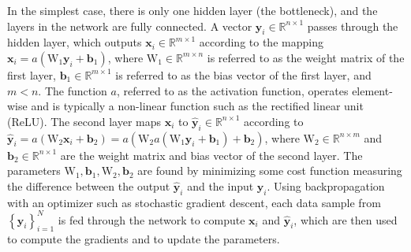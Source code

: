 \documentclass[journal]{IEEEtran}
\begin{document}
In the simplest case, there is only one hidden layer (the bottleneck), and the layers in the network are fully connected. A vector $\textbf{y}_i \in \mathbb{R}^{n \times 1}$ passes through the hidden layer, which outputs $\textbf{x}_i \in \mathbb{R}^{m \times 1}$ according to the mapping $\textbf{x}_i = a\left( \text{W}_1 \textbf{y}_i + \textbf{b}_1 \right)$, where $\text{W}_1 \in \mathbb{R}^{m \times n}$ is referred to as the weight matrix of the first layer, $\textbf{b}_1 \in \mathbb{R}^{m \times 1}$ is referred to as the bias vector of the first layer, and $m < n$. The function $a$, referred to as the activation function, operates element-wise and is typically a non-linear function such as the rectified linear unit (ReLU). The second layer maps $\textbf{x}_i$ to $\hat{\textbf{y}}_i \in \mathbb{R}^{n \times 1}$ according to $\hat{\textbf{y}}_i = a\left( \text{W}_2 \textbf{x}_i + \textbf{b}_2 \right) = a\left( \text{W}_2 a\left( \text{W}_1 \textbf{y}_i + \textbf{b}_1 \right)+ \textbf{b}_2 \right)$, where $\text{W}_2 \in \mathbb{R}^{n \times m}$ and $\textbf{b}_2 \in \mathbb{R}^{n \times 1}$ are the weight matrix and bias vector of the second layer. The parameters $\text{W}_1, \textbf{b}_1, \text{W}_2, \textbf{b}_2$ are found by minimizing some cost function measuring the difference between the output $\hat{\textbf{y}}_i$ and the input $\textbf{y}_i$. Using backpropagation with an optimizer such as stochastic gradient descent, each data sample from $\left\{ \textbf{y}_i \right\}_{i=1}^N$ is fed through the network to compute $\textbf{x}_i$ and $\hat{\textbf{y}}_i$, which are then used to compute the gradients and to update the parameters.
\end{document}

